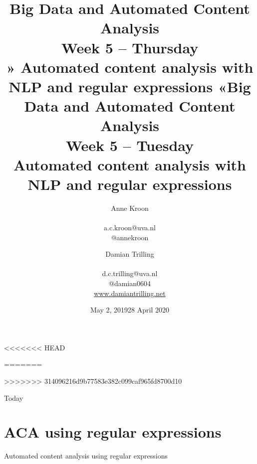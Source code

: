 \documentclass{beamer}
\begin{document}
<<<<<<< HEAD
\title[Big Data and Automated Content Analysis]{\textbf{Big Data and Automated Content Analysis} \\ Week 5 -- Thursday \\ » Automated content analysis with NLP and regular expressions «}
\author[Anne Kroon]{Anne Kroon \\ ~ \\ \footnotesize{a.c.kroon@uva.nl \\@annekroon} \\}
\date{May 2, 2019}
=======

\title[Big Data and Automated Content Analysis]{\textbf{Big Data and Automated Content Analysis} \\ Week 5 -- Tuesday \\ Automated content analysis with NLP and regular expressions}
\author[Damian Trilling]{Damian Trilling \\ ~ \\ \footnotesize{d.c.trilling@uva.nl \\@damian0604} \\ \url{www.damiantrilling.net}}
\date{28 April 2020}
>>>>>>> 314096216d9b77583e382c099caf965fd8700d10

\begin{frame}{}
\titlepage
\end{frame}

\begin{frame}{Today}
\tableofcontents
\end{frame}



\section[Regular expressions]{ACA using regular expressions}

\begin{frame}
Automated content analysis using regular expressions
\end{frame}
\end{document}
